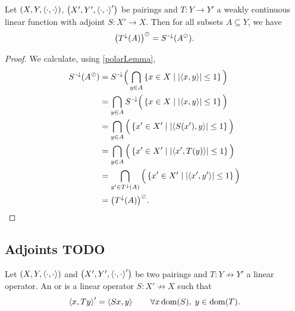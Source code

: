 \begin{lemma}
Let $\left( X,Y,\left\langle \cdot,\cdot \right\rangle \right)$, $\left( X',Y',\left\langle \cdot,\cdot \right\rangle' \right)$ be pairings and $T: Y\to Y'$ a weakly continuous linear function with adjoint $S: X'\to X$. Then for all subsets $A\subseteq Y$, we have
\[ \big(T^{\downarrow}(A)\big)^\oslash = S^{{\text{\hspace{0.15em}-}\downarrow}}(A^\oslash). \]
\end{lemma}
\begin{proof}
We calculate, using \ref{polarLemma},
\begin{align*}
S^{{\text{\hspace{0.15em}-}\downarrow}}(A^\oslash) &= S^{{\text{\hspace{0.15em}-}\downarrow}}\Big(\bigcap_{y\in A}\left\{ x\in X \;\middle|\; \left|\left\langle x,y \right\rangle\right|\leq 1 \right\}\Big) \\
&= \bigcap_{y\in A}S^{{\text{\hspace{0.15em}-}\downarrow}}\Big(\left\{ x\in X \;\middle|\; \left|\left\langle x,y \right\rangle\right|\leq 1 \right\}\Big) \\
&= \bigcap_{y\in A}\Big(\left\{ x'\in X' \;\middle|\; \left|\left\langle S(x'),y \right\rangle\right|\leq 1 \right\}\Big) \\
&= \bigcap_{y\in A}\Big(\left\{ x'\in X' \;\middle|\; \left|\left\langle x',T(y) \right\rangle\right|\leq 1 \right\}\Big) \\
&= \bigcap_{y'\in T^{\downarrow}(A)}\Big(\left\{ x'\in X' \;\middle|\; \left|\left\langle x',y' \right\rangle\right|\leq 1 \right\}\Big) \\
&= \big(T^{\downarrow}(A)\big)^\oslash.
\end{align*}
\end{proof}

\subsection{Adjoints TODO}
\begin{definition}
Let $\left( X,Y,\left\langle \cdot,\cdot \right\rangle \right)$ and $\left( X',Y',\left\langle \cdot,\cdot \right\rangle' \right)$ be two pairings and $T: Y\not\to Y'$ a linear operator. An  or  is a linear operator $S: X'\not\to X$ such that
\[ \left\langle x, Ty \right\rangle' = \left\langle Sx, y \right\rangle \qquad \forall x\operatorname{dom}(S), \; y\in\operatorname{dom}(T). \]
\end{definition}


